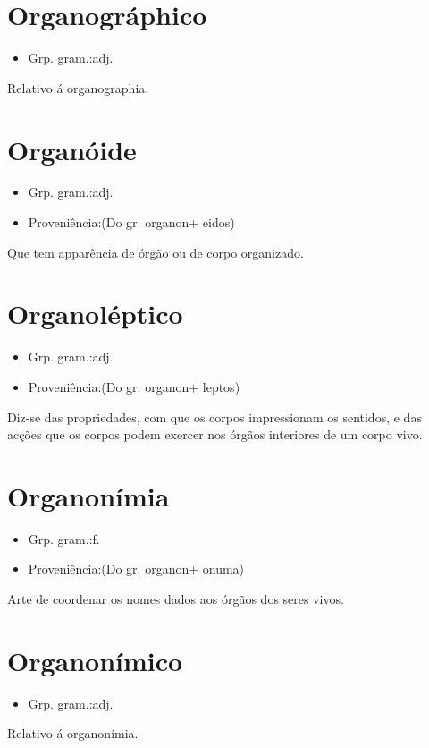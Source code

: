 \section{Organográphico}
\begin{itemize}
\item {Grp. gram.:adj.}
\end{itemize}
Relativo á organographia.
\section{Organóide}
\begin{itemize}
\item {Grp. gram.:adj.}
\end{itemize}
\begin{itemize}
\item {Proveniência:(Do gr. \textunderscore organon\textunderscore  + \textunderscore eidos\textunderscore )}
\end{itemize}
Que tem apparência de órgão ou de corpo organizado.
\section{Organoléptico}
\begin{itemize}
\item {Grp. gram.:adj.}
\end{itemize}
\begin{itemize}
\item {Proveniência:(Do gr. \textunderscore organon\textunderscore  + \textunderscore leptos\textunderscore )}
\end{itemize}
Diz-se das propriedades, com que os corpos impressionam os sentidos, e das acções que os corpos podem exercer nos órgãos interiores de um corpo vivo.
\section{Organonímia}
\begin{itemize}
\item {Grp. gram.:f.}
\end{itemize}
\begin{itemize}
\item {Proveniência:(Do gr. \textunderscore organon\textunderscore  + \textunderscore onuma\textunderscore )}
\end{itemize}
Arte de coordenar os nomes dados aos órgãos dos seres vivos.
\section{Organonímico}
\begin{itemize}
\item {Grp. gram.:adj.}
\end{itemize}
Relativo á organonímia.
